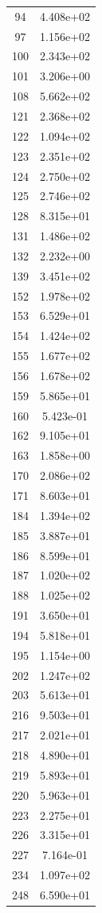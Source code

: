 \documentclass[12pt]{article}
\begin{document}
\begin{longtable}{@{}cc@{}}
94 & 4.408e+02 \\
97 & 1.156e+02 \\
100 & 2.343e+02 \\
101 & 3.206e+00 \\
108 & 5.662e+02 \\
121 & 2.368e+02 \\
122 & 1.094e+02 \\
123 & 2.351e+02 \\
124 & 2.750e+02 \\
125 & 2.746e+02 \\
128 & 8.315e+01 \\
131 & 1.486e+02 \\
132 & 2.232e+00 \\
139 & 3.451e+02 \\
152 & 1.978e+02 \\
153 & 6.529e+01 \\
154 & 1.424e+02 \\
155 & 1.677e+02 \\
156 & 1.678e+02 \\
159 & 5.865e+01 \\
160 & 5.423e-01 \\
162 & 9.105e+01 \\
163 & 1.858e+00 \\
170 & 2.086e+02 \\
171 & 8.603e+01 \\
184 & 1.394e+02 \\
185 & 3.887e+01 \\
186 & 8.599e+01 \\
187 & 1.020e+02 \\
188 & 1.025e+02 \\
191 & 3.650e+01 \\
194 & 5.818e+01 \\
195 & 1.154e+00 \\
202 & 1.247e+02 \\
203 & 5.613e+01 \\
216 & 9.503e+01 \\
217 & 2.021e+01 \\
218 & 4.890e+01 \\
219 & 5.893e+01 \\
220 & 5.963e+01 \\
223 & 2.275e+01 \\
226 & 3.315e+01 \\
227 & 7.164e-01 \\
234 & 1.097e+02 \\
248 & 6.590e+01 \\

\end{longtable}
\end{document}
